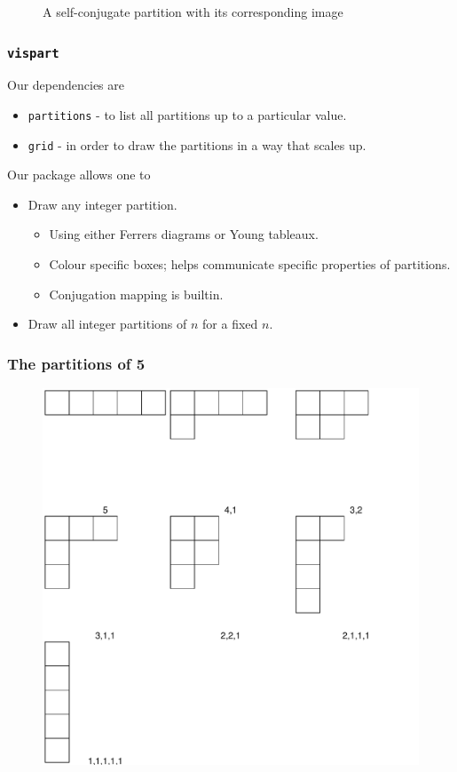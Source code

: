 \documentclass{beamer}
\begin{document}
\begin{frame}
\begin{figure}
\begin{subfigure}[b]{0.5\textwidth}
     \end{subfigure}
        \caption{A self-conjugate partition with its corresponding image}
        \label{fig:three graphs}
\end{figure}

\end{frame}

\begin{frame}
\frametitle{\texttt{vispart} }	
Our dependencies are 
\begin{itemize}
\item \texttt{partitions} - to list all partitions up to a particular value.
\item \texttt{grid} - in order to draw the partitions in a way that scales up.
\end{itemize}	

Our package allows one to 
\begin{itemize}
\item Draw any integer partition.
\begin{itemize}
\item Using either Ferrers diagrams or Young tableaux.
\item Colour specific boxes; helps communicate specific properties of partitions.
\item Conjugation mapping is builtin.
\end{itemize}
\item Draw all integer partitions of $n$ for a fixed $n$.
\end{itemize}


\end{frame}
\begin{frame}
\frametitle{The partitions of 5}
\begin{figure}
\includegraphics[scale = 0.4]{Partitions5}	
\end{figure}
\end{frame}
\end{document}
